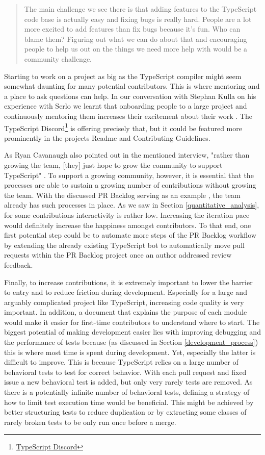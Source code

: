 \documentclass[12pt]{scrartcl}
\begin{document}
\begin{quote}
    The main challenge we see there is that adding features to the TypeScript code base is actually easy and fixing bugs is really hard. People are a lot more excited to add features than fix bugs because it’s fun. Who can blame them? Figuring out what we can do about that and encouraging people to help us out on the things we need more help with would be a community challenge. \cite{RyanDonovan2020}
\end{quote}

Starting to work on a project as big as the TypeScript compiler might seem somewhat daunting for many potential contributors. This is where mentoring and a place to ask questions can help. In our conversation with Stephan Kulla on his experience with Serlo we learnt that onboarding people to a large project and continuously mentoring them increases their excitement about their work \cite{Priv2}. The TypeScript Discord\footnote{\href{https://discord.gg/typescript}{TypeScript Discord}} is offering precisely that, but it could be featured more prominently in the projects Readme and Contributing Guidelines.

As Ryan Cavanaugh also pointed out in the mentioned interview, "rather than growing the team, [they] just hope to grow the community to support TypeScript" \cite{RyanDonovan2020}. To support a growing community, however, it is essential that the processes are able to sustain a growing number of contributions without growing the team. With the discussed PR Backlog serving as an example \cite{PRBacklog}, the team already has such processes in place. As we saw in Section \ref{quantitative_analysis}, for some contributions interactivity is rather low. Increasing the iteration pace would definitely increase the happiness amongst contributors. To that end, one first potential step could be to automate more steps of the PR Backlog workflow by extending the already existing TypeScript bot to automatically move pull requests within the PR Backlog project once an author addressed review feedback.

Finally, to increase contributions, it is extremely important to lower the barrier to entry and to reduce friction during development. Especially for a large and arguably complicated project like TypeScript, increasing code quality is very important. In addition, a document that explains the purpose of each module would make it easier for first-time contributors to understand where to start. The biggest potential of making development easier lies with improving debugging and the performance of tests because (as discussed in Section \ref{development_process}) this is where most time is spent during development. Yet, especially the latter is difficult to improve. This is because TypeScript relies on a large number of behavioral tests to test for correct behavior. With each pull request and fixed issue a new behavioral test is added, but only very rarely tests are removed. As there is a potentially infinite number of behavioral tests, defining a strategy of how to limit test execution time would be beneficial. This might be achieved by better structuring tests to reduce duplication or by extracting some classes of rarely broken tests to be only run once before a merge.
\end{document}
